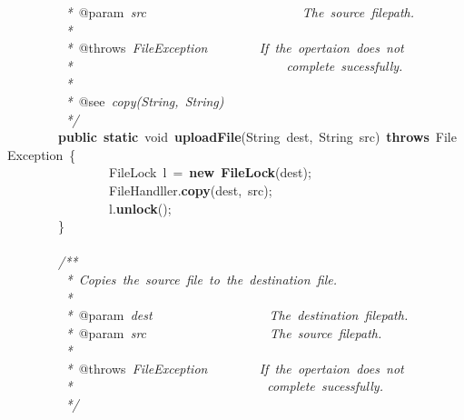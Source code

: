 \mbox{}\textit{\ \ \ \ \ \ \ \ \ *\ }@param\textit{\ src\ \ \ \ \ \ \ \ \ \ \ \ \ \ \ \ \ \ \ \ \ \ \ \ The\ source\ filepath.} \\
\mbox{}\textit{\ \ \ \ \ \ \ \ \ *} \\
\mbox{}\textit{\ \ \ \ \ \ \ \ \ *\ }@throws\textit{\ FileException\ \ \ \ \ \ \ \ If\ the\ opertaion\ does\ not} \\
\mbox{}\textit{\ \ \ \ \ \ \ \ \ *\ \ \ \ \ \ \ \ \ \ \ \ \ \ \ \ \ \ \ \ \ \ \ \ \ \ \ \ \ \ \ \ \ complete\ sucessfully.} \\
\mbox{}\textit{\ \ \ \ \ \ \ \ \ *} \\
\mbox{}\textit{\ \ \ \ \ \ \ \ \ *\ }@see\textit{\ copy(String,\ String)} \\
\mbox{}\textit{\ \ \ \ \ \ \ \ \ */} \\
\mbox{}\ \ \ \ \ \ \ \ \textbf{public}\ \textbf{static}\ void\ \textbf{uploadFile}(String\ dest,\ String\ src)\ \textbf{throws}\ FileException\ \{ \\
\mbox{}\ \ \ \ \ \ \ \ \ \ \ \ \ \ \ \ FileLock\ l\ =\ \textbf{new}\ \textbf{FileLock}(dest); \\
\mbox{}\ \ \ \ \ \ \ \ \ \ \ \ \ \ \ \ FileHandller.\textbf{copy}(dest,\ src); \\
\mbox{}\ \ \ \ \ \ \ \ \ \ \ \ \ \ \ \ l.\textbf{unlock}(); \\
\mbox{}\ \ \ \ \ \ \ \ \} \\
\mbox{} \\
\mbox{}\ \ \ \ \ \ \ \ \textit{/**} \\
\mbox{}\textit{\ \ \ \ \ \ \ \ \ *\ Copies\ the\ source\ file\ to\ the\ destination\ file.} \\
\mbox{}\textit{\ \ \ \ \ \ \ \ \ *} \\
\mbox{}\textit{\ \ \ \ \ \ \ \ \ *\ }@param\textit{\ dest\ \ \ \ \ \ \ \ \ \ \ \ \ \ \ \ \ \ The\ destination\ filepath.} \\
\mbox{}\textit{\ \ \ \ \ \ \ \ \ *\ }@param\textit{\ src\ \ \ \ \ \ \ \ \ \ \ \ \ \ \ \ \ \ \ The\ source\ filepath.} \\
\mbox{}\textit{\ \ \ \ \ \ \ \ \ *} \\
\mbox{}\textit{\ \ \ \ \ \ \ \ \ *\ }@throws\textit{\ FileException\ \ \ \ \ \ \ \ If\ the\ opertaion\ does\ not} \\
\mbox{}\textit{\ \ \ \ \ \ \ \ \ *\ \ \ \ \ \ \ \ \ \ \ \ \ \ \ \ \ \ \ \ \ \ \ \ \ \ \ \ \ \ complete\ sucessfully.} \\
\mbox{}\textit{\ \ \ \ \ \ \ \ \ */} \\
